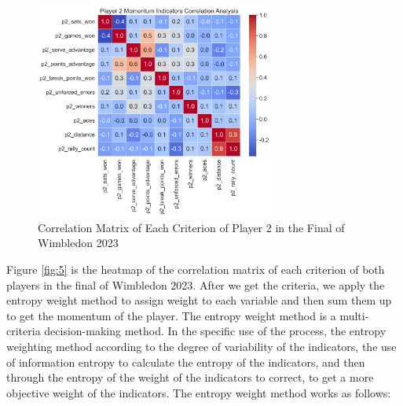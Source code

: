 \documentclass[12pt]{article}
\begin{document}
\begin{figure}[h!]
    \centering
    \includegraphics[width=0.7\textwidth]{correlation_2.png}
    \caption{Correlation Matrix of Each Criterion of Player 2 in the Final of Wimbledon 2023} 
    \label{fig:6}
\end{figure}

Figure \ref{fig:5} is the heatmap of the correlation matrix of each criterion of both players in the final of Wimbledon 2023. After we get the criteria, we apply the entropy weight method to assign weight to each variable and then sum them up to get the momentum of the player. 
The entropy weight method is a multi-criteria decision-making method. In the specific use of the process, the entropy weighting method according to the degree of 
variability of the indicators, the use of information entropy to calculate the entropy of the indicators, and then through the entropy of the weight of the 
indicators to correct, to get a more objective weight of the indicators. The entropy weight method works as follows:
\end{document}
